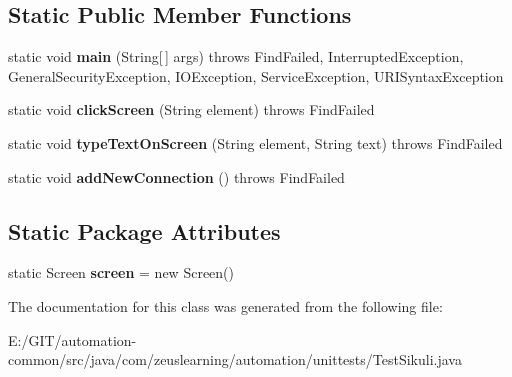 \subsection*{Static Public Member Functions}
\begin{DoxyCompactItemize}
\item 
\hypertarget{classcom_1_1zeuslearning_1_1automation_1_1unittests_1_1TestSikuli_a9689fc4a8362ccd621fee5925fbc6604}{}\label{classcom_1_1zeuslearning_1_1automation_1_1unittests_1_1TestSikuli_a9689fc4a8362ccd621fee5925fbc6604} 
static void {\bfseries main} (String\mbox{[}$\,$\mbox{]} args)  throws Find\+Failed, Interrupted\+Exception, General\+Security\+Exception,             I\+O\+Exception, Service\+Exception, U\+R\+I\+Syntax\+Exception 
\item 
\hypertarget{classcom_1_1zeuslearning_1_1automation_1_1unittests_1_1TestSikuli_a15d2a9cfa7cafad2668b3293f63db624}{}\label{classcom_1_1zeuslearning_1_1automation_1_1unittests_1_1TestSikuli_a15d2a9cfa7cafad2668b3293f63db624} 
static void {\bfseries click\+Screen} (String element)  throws Find\+Failed 
\item 
\hypertarget{classcom_1_1zeuslearning_1_1automation_1_1unittests_1_1TestSikuli_a709c565908e133895beaeb453c1ab0cc}{}\label{classcom_1_1zeuslearning_1_1automation_1_1unittests_1_1TestSikuli_a709c565908e133895beaeb453c1ab0cc} 
static void {\bfseries type\+Text\+On\+Screen} (String element, String text)  throws Find\+Failed 
\item 
\hypertarget{classcom_1_1zeuslearning_1_1automation_1_1unittests_1_1TestSikuli_a2e9dcc4420755bd9d61e4792308be000}{}\label{classcom_1_1zeuslearning_1_1automation_1_1unittests_1_1TestSikuli_a2e9dcc4420755bd9d61e4792308be000} 
static void {\bfseries add\+New\+Connection} ()  throws Find\+Failed 
\end{DoxyCompactItemize}
\subsection*{Static Package Attributes}
\begin{DoxyCompactItemize}
\item 
\hypertarget{classcom_1_1zeuslearning_1_1automation_1_1unittests_1_1TestSikuli_a59004d7954d9d06149f2343dd124d629}{}\label{classcom_1_1zeuslearning_1_1automation_1_1unittests_1_1TestSikuli_a59004d7954d9d06149f2343dd124d629} 
static Screen {\bfseries screen} = new Screen()
\end{DoxyCompactItemize}


The documentation for this class was generated from the following file\+:\begin{DoxyCompactItemize}
\item 
E\+:/\+G\+I\+T/automation-\/common/src/java/com/zeuslearning/automation/unittests/Test\+Sikuli.\+java\end{DoxyCompactItemize}
